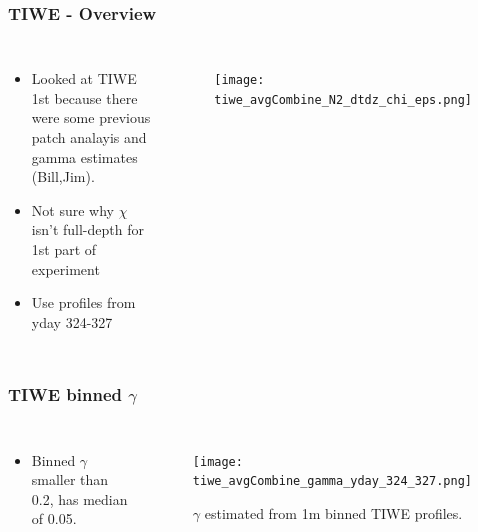 \documentclass{beamer}
\begin{document}
\begin{frame}
 \frametitle{TIWE - Overview}

\begin{columns}
\begin{itemize}
\item Looked at TIWE 1st because there were some previous patch analayis and gamma estimates (Bill,Jim).
\item Not sure why $\chi$ isn't full-depth for 1st part of experiment
\item Use profiles from yday 324-327
\end{itemize}

\begin{figure}[htbp]
\begin{center}
\texttt{[image: tiwe\_avgCombine\_N2\_dtdz\_chi\_eps.png]}
\caption{}
\label{default}
\end{center}
\end{figure}

\end{columns}


\end{frame}


\begin{frame}
 \frametitle{TIWE binned $\gamma$}

\begin{columns}
\begin{itemize}
\item Binned $\gamma$ smaller than 0.2, has median of 0.05.
\end{itemize}

\begin{figure}[htbp]
\begin{center}
\texttt{[image: tiwe\_avgCombine\_gamma\_yday\_324\_327.png]}
\caption{$\gamma$ estimated from 1m binned TIWE profiles.}
\label{default}
\end{center}
\end{figure}

\end{columns}


\end{frame}
\end{document}
